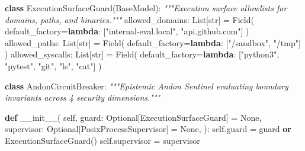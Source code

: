 \documentclass[
  10pt,letterpaper]{article}
\newenvironment{Shaded}{}{}
\newcommand{\BuiltInTok}[1]{\textcolor[rgb]{0.00,0.50,0.00}{#1}}
\newcommand{\CommentTok}[1]{\textcolor[rgb]{0.38,0.63,0.69}{\textit{#1}}}
\newcommand{\FunctionTok}[1]{\textcolor[rgb]{0.02,0.16,0.49}{#1}}
\newcommand{\KeywordTok}[1]{\textcolor[rgb]{0.00,0.44,0.13}{\textbf{#1}}}
\newcommand{\NormalTok}[1]{#1}
\newcommand{\OperatorTok}[1]{\textcolor[rgb]{0.40,0.40,0.40}{#1}}
\newcommand{\StringTok}[1]{\textcolor[rgb]{0.25,0.44,0.63}{#1}}
\newcommand{\VariableTok}[1]{\textcolor[rgb]{0.10,0.09,0.49}{#1}}
\begin{document}
\begin{Shaded}
\begin{Highlighting}[]
\KeywordTok{class}\NormalTok{ ExecutionSurfaceGuard(BaseModel):}
    \CommentTok{"""Execution surface allowlists for domains, paths, and binaries."""}
\NormalTok{    allowed\_domains: List[}\BuiltInTok{str}\NormalTok{] }\OperatorTok{=}\NormalTok{ Field(}
\NormalTok{        default\_factory}\OperatorTok{=}\KeywordTok{lambda}\NormalTok{: [}\StringTok{"internal{-}eval.local"}\NormalTok{, }\StringTok{"api.github.com"}\NormalTok{]}
\NormalTok{    )}
\NormalTok{    allowed\_paths: List[}\BuiltInTok{str}\NormalTok{] }\OperatorTok{=}\NormalTok{ Field(}
\NormalTok{        default\_factory}\OperatorTok{=}\KeywordTok{lambda}\NormalTok{: [}\StringTok{"/sandbox"}\NormalTok{, }\StringTok{"/tmp"}\NormalTok{]}
\NormalTok{    )}
\NormalTok{    allowed\_syscalls: List[}\BuiltInTok{str}\NormalTok{] }\OperatorTok{=}\NormalTok{ Field(}
\NormalTok{        default\_factory}\OperatorTok{=}\KeywordTok{lambda}\NormalTok{: [}\StringTok{"python3"}\NormalTok{, }\StringTok{"pytest"}\NormalTok{, }\StringTok{"git"}\NormalTok{, }\StringTok{"ls"}\NormalTok{, }\StringTok{"cat"}\NormalTok{]}
\NormalTok{    )}

\KeywordTok{class}\NormalTok{ AndonCircuitBreaker:}
    \CommentTok{"""Epistemic Andon Sentinel evaluating boundary invariants across 4 security dimensions."""}

    \KeywordTok{def} \FunctionTok{\_\_init\_\_}\NormalTok{(}
        \VariableTok{self}\NormalTok{,}
\NormalTok{        guard: Optional[ExecutionSurfaceGuard] }\OperatorTok{=} \VariableTok{None}\NormalTok{,}
\NormalTok{        supervisor: Optional[PosixProcessSupervisor] }\OperatorTok{=} \VariableTok{None}\NormalTok{,}
\NormalTok{    ):}
        \VariableTok{self}\NormalTok{.guard }\OperatorTok{=}\NormalTok{ guard }\KeywordTok{or}\NormalTok{ ExecutionSurfaceGuard()}
        \VariableTok{self}\NormalTok{.supervisor }\OperatorTok{=}\NormalTok{ supervisor}


\end{Highlighting}
\end{Shaded}
\end{document}
